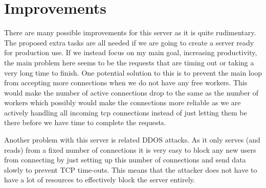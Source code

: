 \chapter{Improvements}
There are many possible improvements for this server as it is quite rudimentary. The proposed extra tasks are all needed if we are going to create a server ready for production use. If we instead focus on my main goal, increasing productivity, the main problem here seems to be the requests that are timing out or taking a very long time to finish. One potential solution to this is to prevent the main loop from accepting more connections when we do not have any free workers. This would make the number of active connections drop to the same as the number of workers which possibly would make the connections more reliable as we are actively handling all incoming tcp connections instead of just letting them be there before we have time to complete the requests.

Another problem with this server is related DDOS attacks. As it only serves (and reads) from a fixed number of connections it is very easy to block any new users from connecting by just setting up this number of connections and send data slowly to prevent TCP time-outs. This means that the attacker does not have to have a lot of resources to effectively block the server entirely.  
